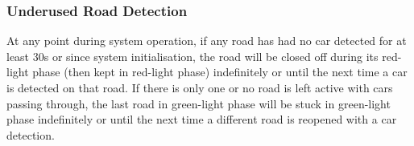 \subsubsection{Underused Road Detection}
At any point during system operation, if any road has had no car detected for at least 30\unit{\second} or since system initialisation, the road will be closed off during its red-light phase (then kept in red-light phase) indefinitely or until the next time a car is detected on that road. If there is only one or no road is left active with cars passing through, the last road in green-light phase will be stuck in green-light phase indefinitely or until the next time a different road is reopened with a car detection.